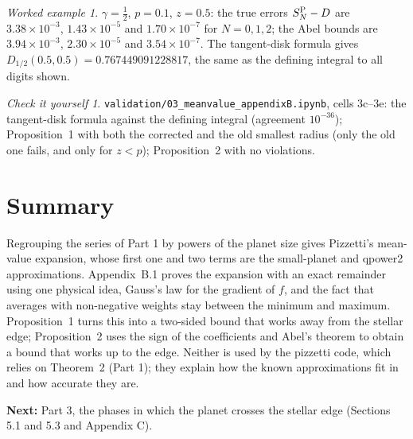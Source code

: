 \documentclass[11pt,a4paper]{article}
\theoremstyle{remark}
\newtheorem*{example}{Worked example}
\newtheorem*{checkit}{Check it yourself}
\newcommand{\nb}[1]{\texttt{validation/#1}}
\begin{document}
\begin{example}
$\gamma=\tfrac12$, $p=0.1$, $z=0.5$: the true errors $S^{\rm P}_N-D$ are $3.38\times10^{-3}$,
$1.43\times10^{-5}$ and $1.70\times10^{-7}$ for $N=0,1,2$; the Abel bounds are
$3.94\times10^{-3}$, $2.30\times10^{-5}$ and $3.54\times10^{-7}$. The tangent-disk formula gives
$D_{1/2}(0.5,0.5)=0.767449091228817$, the same as the defining integral to all digits shown.
\end{example}

\begin{checkit}
\nb{03\_meanvalue\_appendixB.ipynb}, cells 3c--3e: the tangent-disk formula against the defining
integral (agreement $10^{-36}$); Proposition~1 with both the corrected and the old smallest radius
(only the old one fails, and only for $z<p$); Proposition~2 with no violations.
\end{checkit}

\section{Summary}

Regrouping the series of Part 1 by powers of the planet size gives Pizzetti's mean-value expansion,
whose first one and two terms are the small-planet and qpower2 approximations. Appendix~B.1 proves
the expansion with an exact remainder using one physical idea, Gauss's law for the gradient of $f$,
and the fact that averages with non-negative weights stay between the minimum and maximum.
Proposition~1 turns this into a two-sided bound that works away from the stellar edge;
Proposition~2 uses the sign of the coefficients and Abel's theorem to obtain a bound that works up
to the edge. Neither is used by the pizzetti code, which relies on Theorem~2 (Part 1); they explain
how the known approximations fit in and how accurate they are.

\medskip\noindent\textbf{Next:} Part 3, the phases in which the planet crosses the stellar edge
(Sections 5.1 and 5.3 and Appendix C).
\end{document}
